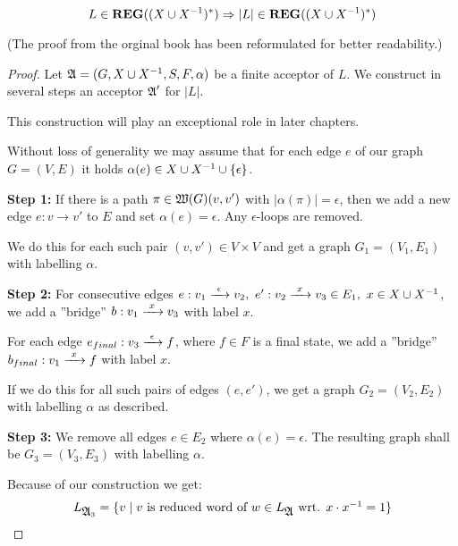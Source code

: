 \begin{lemma}
\[ L \in \mbox{{\bf REG}}((X \cup {X}^{-1})^*) \Rightarrow |L| \in 
\mbox{{\bf REG}}((X \cup {X}^{-1})^*) \]
\end{lemma}

(The proof from the orginal book has been reformulated for better readability.)

\begin{proof}
Let $\mbox{$\mathfrak{A}$} = (G, X \cup {X}^{-1}, S, F, \alpha)$ be a finite acceptor of $L$. We
construct in several steps an acceptor $\mbox{$\mathfrak{A}$}'$ for $|L|$.

This construction will play an exceptional role in later chapters.

Without loss of generality we may assume that for each edge $e$ of our graph $G
= (V, E)$ it holds $\alpha(e) \in X \cup {X}^{-1} \cup \mbox{$\{\epsilon\}$}$.

{\bf Step 1:} If there is a path $\pi \in \mbox{$\mathfrak{W}({G})$}(v, v')$ with
$|\alpha(\pi)| = \epsilon$, then we add a new edge $e: v \to v'$ to $E$ and set
$\alpha(e) = \epsilon$. Any $\epsilon$-loops are removed.

\begin{center}

\end{center}

We do this for each such pair $(v, v')\in V \times V$ and get a graph $G_1 =
(V_1, E_1)$ with labelling $\alpha$.

\medskip
{\bf Step 2:} For consecutive edges $e: v_1 \xrightarrow{\ {\epsilon}\ } v_2,\ e': v_2
\xrightarrow{\ {x}\ } v_3 \in E_1,\ x \in X \cup {X}^{-1}$, we add a ''bridge'' $b: v_1 \xrightarrow{\ {x}\ }
v_3$ with label $x$.

For each edge $e_{final}: v_3 \xrightarrow{\ {\epsilon}\ } f$, where $f \in F$ is a final
state, we add a ''bridge'' $b_{final}: v_1 \xrightarrow{\ {x}\ } f$ with label $x$.

\begin{center}

\end{center}

If we do this for all such pairs of edges $(e, e')$, we get a graph
$G_2=(V_2,E_2)$ with labelling $\alpha$ as described.

\medskip
{\bf Step 3:} We remove all edges $e \in E_2$ where $\alpha(e) = \epsilon$. The
resulting graph shall be $G_3=(V_3,E_3)$ with labelling $\alpha$.

Because of our construction we get:
\[ L_{\mbox{$\mathfrak{A}$}_3} = \mbox{$\{v \mid v \mbox{ is reduced word of } w \in
L_{\mbox{$\mathfrak{A}$}} \mbox{ wrt. } x \cdot x^{-1} = 1\}$} \]


\end{proof}
